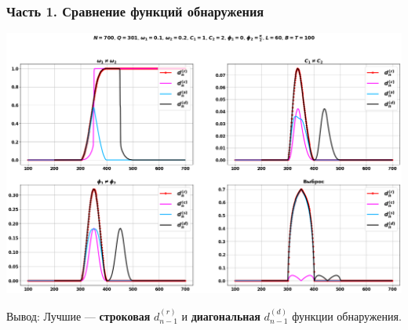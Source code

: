 \documentclass[pdf, 9pt,intlimits, unicode]{beamer}
\begin{document}
	\begin{frame}
		\frametitle{Часть 1. Сравнение функций обнаружения}
			\begin{center}
				{\includegraphics[width=\linewidth]{imgs/detectionTests}}
			\end{center}
			{\color{blue} Вывод:} Лучшие --- \textbf{строковая} $ d_{n-1}^{(r)} $ и \textbf{диагональная} $ d_{n-1}^{(d)} $ функции обнаружения.
	\end{frame}
\end{document}
